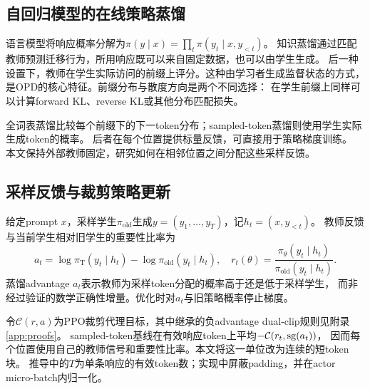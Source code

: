 \subsection{自回归模型的在线策略蒸馏}
语言模型将响应概率分解为$\pi(y\mid x)=\prod_t\pi(y_t\mid x,y_{<t})$。
知识蒸馏通过匹配教师预测迁移行为，所用响应既可以来自固定数据，也可以由学生生成。
后一种设置下，教师在学生实际访问的前缀上评分。这种由学习者生成监督状态的方式，
是OPD的核心特征\citep{dagger,gkd}。前缀分布与散度方向是两个不同选择：
在学生前缀上同样可以计算forward KL、reverse KL或其他分布匹配损失。

全词表蒸馏比较每个前缀下的下一token分布；sampled-token蒸馏则使用学生实际生成token的概率。
后者在每个位置提供标量反馈，可直接用于策略梯度训练\citep{minillm,revisiting}。
本文保持外部教师固定，研究如何在相邻位置之间分配这些采样反馈。

\subsection{采样反馈与裁剪策略更新}
给定prompt $x$，采样学生$\pi_{\mathrm{old}}$生成$y=(y_1,\ldots,y_T)$，记$h_t=(x,y_{<t})$。
教师反馈与当前学生相对旧学生的重要性比率为
\begin{equation}
 a_t=\log\pi_{\mathrm{T}}(y_t\mid h_t)-\log\pi_{\mathrm{old}}(y_t\mid h_t),
 \quad r_t(\theta)=\frac{\pi_\theta(y_t\mid h_t)}{\pi_{\mathrm{old}}(y_t\mid h_t)}.
 \label{eq:token}
\end{equation}
蒸馏advantage $a_t$表示教师为采样token分配的概率高于还是低于采样学生，
而非经过验证的数学正确性增量。优化时对$a_t$与旧策略概率停止梯度。

令$\mathcal C(r,a)$为PPO裁剪代理目标\citep{ppo}，其中继承的负advantage dual-clip规则见附录\ref{app:proofs}。
sampled-token基线在有效响应token上平均$-\mathcal C(r_t,\operatorname{sg}(a_t))$，
因而每个位置使用自己的教师信号和重要性比率。本文将这一单位改为连续的短token块。
推导中的$T$为单条响应的有效token数；实现中屏蔽padding，并在actor micro-batch内归一化。
